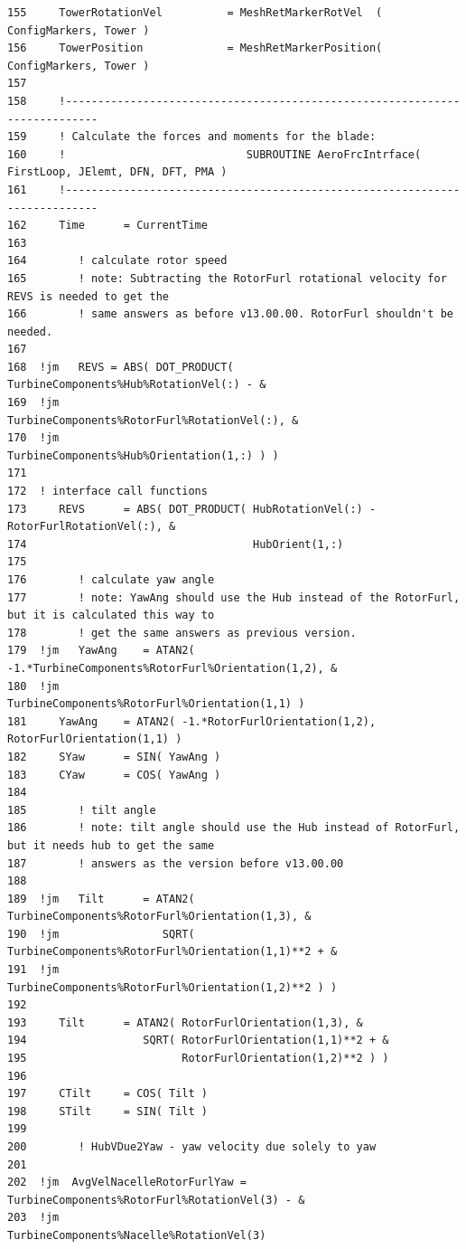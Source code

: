 \documentclass[11pt]{article}
\begin{document}
{\begin{verbatim}
155     TowerRotationVel          = MeshRetMarkerRotVel  ( ConfigMarkers, Tower )
156     TowerPosition             = MeshRetMarkerPosition( ConfigMarkers, Tower )
157  
158     !---------------------------------------------------------------------------
159     ! Calculate the forces and moments for the blade: 
160     !                            SUBROUTINE AeroFrcIntrface( FirstLoop, JElemt, DFN, DFT, PMA )
161     !---------------------------------------------------------------------------
162     Time      = CurrentTime
163  
164        ! calculate rotor speed
165        ! note: Subtracting the RotorFurl rotational velocity for REVS is needed to get the
166        ! same answers as before v13.00.00. RotorFurl shouldn't be needed.
167  
168  !jm   REVS = ABS( DOT_PRODUCT( TurbineComponents%Hub%RotationVel(:) - &
169  !jm                                          TurbineComponents%RotorFurl%RotationVel(:), &
170  !jm                                 TurbineComponents%Hub%Orientation(1,:) ) )
171  
172  ! interface call functions
173     REVS      = ABS( DOT_PRODUCT( HubRotationVel(:) - RotorFurlRotationVel(:), &
174                                   HubOrient(1,:)
175  
176        ! calculate yaw angle
177        ! note: YawAng should use the Hub instead of the RotorFurl, but it is calculated this way to
178        ! get the same answers as previous version.
179  !jm   YawAng    = ATAN2( -1.*TurbineComponents%RotorFurl%Orientation(1,2), &
180  !jm                                     TurbineComponents%RotorFurl%Orientation(1,1) ) 
181     YawAng    = ATAN2( -1.*RotorFurlOrientation(1,2), RotorFurlOrientation(1,1) )
182     SYaw      = SIN( YawAng )
183     CYaw      = COS( YawAng )
184  
185        ! tilt angle
186        ! note: tilt angle should use the Hub instead of RotorFurl, but it needs hub to get the same
187        ! answers as the version before v13.00.00
188        
189  !jm   Tilt      = ATAN2( TurbineComponents%RotorFurl%Orientation(1,3), &
190  !jm                SQRT( TurbineComponents%RotorFurl%Orientation(1,1)**2 + &
191  !jm                      TurbineComponents%RotorFurl%Orientation(1,2)**2 ) )
192  
193     Tilt      = ATAN2( RotorFurlOrientation(1,3), &
194                  SQRT( RotorFurlOrientation(1,1)**2 + &
195                        RotorFurlOrientation(1,2)**2 ) )
196  
197     CTilt     = COS( Tilt )
198     STilt     = SIN( Tilt )
199        
200        ! HubVDue2Yaw - yaw velocity due solely to yaw
201        
202  !jm  AvgVelNacelleRotorFurlYaw = TurbineComponents%RotorFurl%RotationVel(3) - &
203  !jm                                                TurbineComponents%Nacelle%RotationVel(3)

\end{verbatim}}
\end{document}
